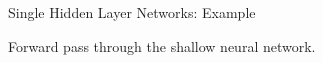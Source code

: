 
\begin{frame} {Single Hidden Layer Networks: Example}
  
  \small{Forward pass through the shallow neural network.}
  \begin{figure}
    \centering

\end{figure}
\end{frame}
